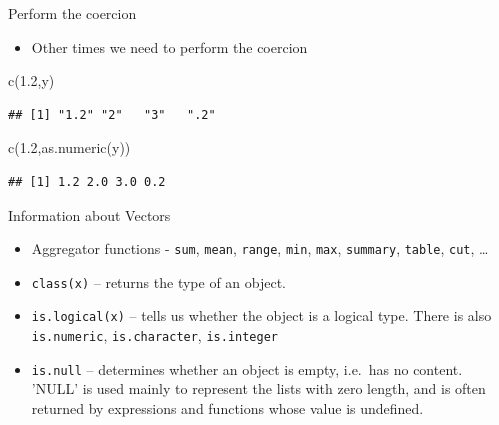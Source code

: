 \documentclass[
  10pt,
  ignorenonframetext,
]{beamer}
\newenvironment{Shaded}{\begin{snugshade}}{\end{snugshade}}
\newcommand{\FloatTok}[1]{\textcolor[rgb]{0.75,0.75,0.82}{#1}}
\newcommand{\KeywordTok}[1]{\textcolor[rgb]{0.94,0.87,0.69}{#1}}
\newcommand{\NormalTok}[1]{\textcolor[rgb]{0.80,0.80,0.80}{#1}}
\providecommand{\tightlist}{%
  \setlength{\itemsep}{0pt}\setlength{\parskip}{0pt}}
\begin{document}
\begin{frame}[fragile]{Perform the coercion}
\protect\hypertarget{perform-the-coercion}{}

\begin{itemize}
\tightlist
\item
  Other times we need to perform the coercion
\end{itemize}

\begin{Shaded}
\begin{Highlighting}[]
\KeywordTok{c}\NormalTok{(}\FloatTok{1.2}\NormalTok{,y)}
\end{Highlighting}
\end{Shaded}

\begin{verbatim}
## [1] "1.2" "2"   "3"   ".2"
\end{verbatim}

\begin{Shaded}
\begin{Highlighting}[]
\KeywordTok{c}\NormalTok{(}\FloatTok{1.2}\NormalTok{,}\KeywordTok{as.numeric}\NormalTok{(y))}
\end{Highlighting}
\end{Shaded}

\begin{verbatim}
## [1] 1.2 2.0 3.0 0.2
\end{verbatim}

\end{frame}

\begin{frame}[fragile]{Information about Vectors}
\protect\hypertarget{information-about-vectors}{}

\begin{itemize}
\item
  Aggregator functions - \texttt{sum}, \texttt{mean}, \texttt{range},
  \texttt{min}, \texttt{max}, \texttt{summary}, \texttt{table},
  \texttt{cut}, \ldots{}
\item
  \texttt{class(x)} -- returns the type of an object.
\item
  \texttt{is.logical(x)} -- tells us whether the object is a logical
  type. There is also \texttt{is.numeric}, \texttt{is.character},
  \texttt{is.integer}
\item
  \texttt{is.null} -- determines whether an object is empty, i.e.~has no
  content. 'NULL' is used mainly to represent the lists with zero
  length, and is often returned by expressions and functions whose value
  is undefined.
\end{itemize}

\end{frame}
\end{document}
